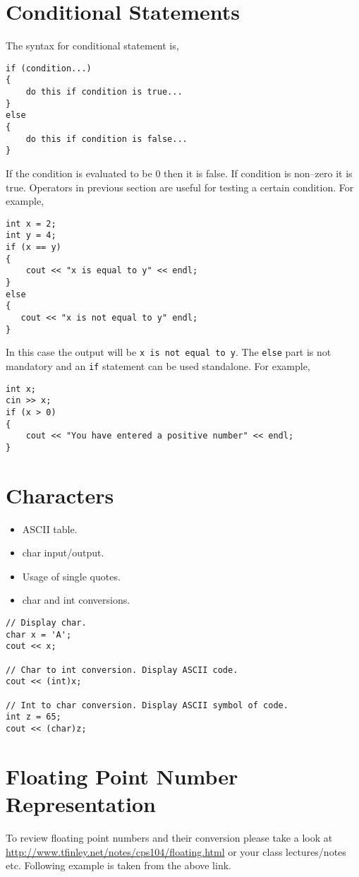 \documentclass[12pt,a4paper]{article}
\begin{document}
\section{Conditional Statements}
The syntax for conditional statement is,
\begin{lstlisting}
if (condition...)
{
    do this if condition is true...
}
else
{
    do this if condition is false...
}
\end{lstlisting}
If the condition is evaluated to be 0 then it is false. If condition is non--zero it is true.
Operators in previous section are useful for testing a certain condition. For example,
\begin{lstlisting}
int x = 2;
int y = 4;
if (x == y)
{
    cout << "x is equal to y" << endl;
}
else
{
   cout << "x is not equal to y" endl;
}
\end{lstlisting}
In this case the output will be \verb|x is not equal to y|. The \verb|else| part is not mandatory and an \verb|if| statement can be used standalone. For example,
\begin{lstlisting}
int x;
cin >> x;
if (x > 0)
{
    cout << "You have entered a positive number" << endl;
}
\end{lstlisting}
\section{Characters}
\begin{itemize}
\item ASCII table.
\item char input/output.
\item Usage of single quotes.
\item char and int conversions.
\end{itemize}
\begin{lstlisting}
// Display char.
char x = 'A';
cout << x;

// Char to int conversion. Display ASCII code.
cout << (int)x;

// Int to char conversion. Display ASCII symbol of code.
int z = 65;
cout << (char)z;
\end{lstlisting}
\section{Floating Point Number Representation}
To review floating point numbers and their conversion please take a look at \url{http://www.tfinley.net/notes/cps104/floating.html} or your class lectures/notes etc. Following example is taken from the above link.
\end{document}
